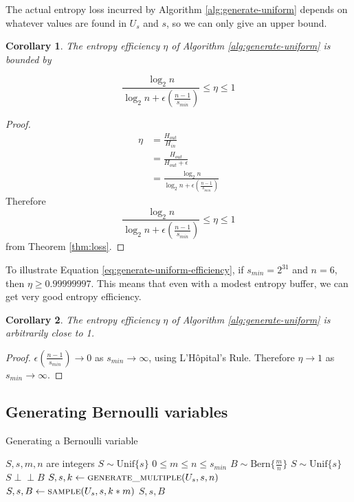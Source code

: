 \documentclass[12pt]{article}
\newtheorem{corollary}{Corollary}
\newcommand{\indep}{\perp\!\!\!\perp}
\newcommand{\unif}[1]{\mathrm{Unif}\{#1\}}
\newcommand{\bern}[1]{\mathrm{Bern}\{#1\}}
\begin{document}
The actual entropy loss incurred by Algorithm \ref{alg:generate-uniform} depends on whatever values are found in $U_s$ and $s$, so we can only give an upper bound.

\begin{corollary}
The entropy efficiency $\eta$ of Algorithm \ref{alg:generate-uniform} is bounded by

\begin{equation}
\frac{\log_2n}{\log_2n + \epsilon(\frac{n-1}{s_{min}})} \le \eta \le 1
\label{eq:generate-uniform-efficiency}
\end{equation}
\end{corollary}

\begin{proof}
\begin{align}
    \eta & = \frac{H_{out}}{H_{in}} \\
         & = \frac{H_{out}}{H_{out}+\epsilon} \\
         & = \frac{\log_2n}{\log_2n + \epsilon(\frac{n-1}{s_{min}})}
\end{align}
Therefore 
\begin{equation}
\frac{\log_2n}{\log_2n + \epsilon(\frac{n-1}{s_{min}})} \le \eta \le 1
\end{equation}
from Theorem \ref{thm:loss}.
\end{proof}

To illustrate Equation \ref{eq:generate-uniform-efficiency}, if $s_{min}=2^{31}$ and $n=6$, then $\eta \ge 0.99999997$. This means that even with a modest entropy buffer, we can get very good entropy efficiency.

\begin{corollary}
The entropy efficiency $\eta$ of Algorithm \ref{alg:generate-uniform} is arbitrarily close to 1.
\end{corollary}

\begin{proof}
$\epsilon(\frac{n-1}{s_{min}}) \rightarrow 0$ as $s_{min} \rightarrow \infty$, using L'H\^opital's Rule. Therefore $\eta \rightarrow 1$ as $s_{min} \rightarrow \infty$.
\end{proof}



\subsection{Generating Bernoulli variables}

\begin{algorithm}
\caption{Generating a Bernoulli variable}
\label{alg:generate-bernoulli}
\begin{algorithmic}[1]
\Require $S, s, m, n$ are integers
\Require $S \sim \unif{s}$
\Require $0 \le m \le n\le s_{min}$
\Ensure $B \sim \bern{\frac{m}{n}}$
\Ensure $S \sim \unif{s}$
\Ensure $S \indep B$
  \State $S, s, k \gets \textsc{generate\_multiple}(U_s, s, n)$
  \State $S, s, B \gets \textsc{sample}(U_s, s, k * m)$
  \State \Return $S, s, B$
\EndProcedure
\end{algorithmic}
\end{algorithm}
\end{document}
